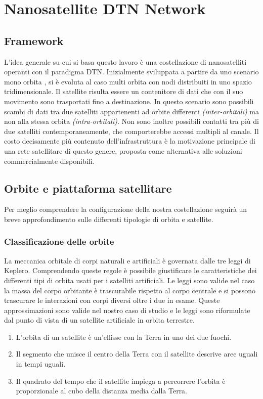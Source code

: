 \documentclass[12pt,a4paper,oneside]{book}
\begin{document}
	
	\chapter{Nanosatellite DTN Network}
		
		\section{Framework}	

		L'idea generale su cui si basa questo lavoro è una costellazione di nanosatelliti operanti con il paradigma DTN. Inizialmente sviluppata a partire da uno scenario mono orbita \cite{cello2014hot}, si è evoluta al caso multi orbita con nodi distribuiti in uno spazio tridimensionale. Il satellite risulta essere un contenitore di dati che con il suo movimento sono trasportati fino a destinazione. In questo scenario sono possibili scambi di dati tra due satelliti appartenenti ad orbite differenti \textit{(inter-orbitali)} ma non alla stessa orbita \textit{(intra-orbitali)}. Non sono inoltre possibili contatti tra più di due satelliti contemporaneamente, che comporterebbe accessi multipli al canale. Il costo decisamente più contenuto dell'infrastruttura è la motivazione principale di una rete satellitare di questo genere, proposta come alternativa alle soluzioni commercialmente disponibili. 
		
		\section{Orbite e piattaforma satellitare}
		Per meglio comprendere la configurazione della nostra costellazione seguirà un breve approfondimento sulle differenti tipologie di orbita e satellite. 

			\subsection{Classificazione delle orbite}
			La meccanica orbitale di corpi naturali e artificiali è governata dalle tre leggi di Keplero. Comprendendo queste regole è possibile giustificare le caratteristiche dei differenti tipi di orbita usati per i satelliti artificiali. Le leggi sono valide nel caso la massa del corpo orbitante è trascurabile rispetto al corpo centrale e si possono trascurare le interazioni con corpi diversi oltre i due in esame. Queste approssimazioni sono valide nel nostro caso di studio e le leggi sono riformulate dal punto di vista di un satellite artificiale in orbita terrestre.
			\begin{enumerate}
				\item L'orbita di un satellite è un'ellisse con la Terra in uno dei due fuochi.
				\item Il segmento che unisce il centro della Terra con il satellite descrive aree uguali in tempi uguali.
				\item Il quadrato del tempo che il satellite impiega a percorrere l'orbita è proporzionale al cubo della distanza media dalla Terra.
			\end{enumerate}
			
\end{document}
